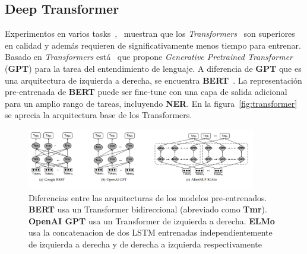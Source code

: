 \subsection{Deep Transformer}


Experimentos en varios tasks~\cite{kitaev2018constituency},~\cite{liu2018generating} muestran que los \emph{Transformers}~\cite{vaswani2017attention} son superiores en calidad y adem\'as requieren de significativamente menos tiempo para entrenar. Basado en \emph{Transformers} est\'a~\cite{radford2018improving} que propone \emph{Generative Pretrained Transformer} (\textbf{GPT}) para la tarea del entendimiento de lenguaje. A diferencia de \textbf{GPT} que es una arquitectura de izquierda a derecha, se encuentra \textbf{BERT}~\cite{devlin2018bert}. La representaci\'on pre-entrenada de \textbf{BERT} puede ser fine-tune con una capa de salida adicional para un amplio rango de tareas, incluyendo \textbf{NER}. En la figura~\ref{fig:transformer} se aprecia la arquitectura base de los Transformers.

\begin{figure}[H]
	\centering
	\includegraphics[width = 10cm]{Imagenes/LM.png}
	\caption{Diferencias entre las arquitecturas de los modelos pre-entrenados. \textbf{BERT} usa un Transformer bidireccional (abreviado como \textbf{Tmr}). \textbf{OpenAI GPT} usa un Transformer de izquierda a derecha. \textbf{ELMo} usa la concatenacion de dos LSTM entrenadas independientemente de izquierda a derecha y de derecha a izquierda respectivamente}\label{fig:LM}
\end{figure}

